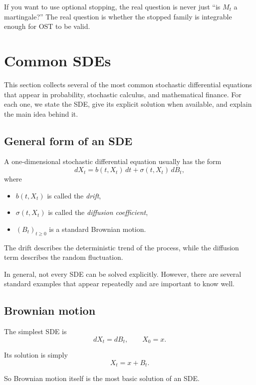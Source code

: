 \documentclass[11pt]{article}
\theoremstyle{definition}
\begin{document}
\begin{keyformula}
If you want to use optional stopping, the real question is never just ``is $M_t$ a martingale?'' The real question is whether the stopped family is integrable enough for OST to be valid.
\end{keyformula}

\section{Common SDEs}

This section collects several of the most common stochastic differential equations that appear in probability, stochastic calculus, and mathematical finance. For each one, we state the SDE, give its explicit solution when available, and explain the main idea behind it.

\subsection{General form of an SDE}

A one-dimensional stochastic differential equation usually has the form
\[
dX_t = b(t,X_t)\,dt + \sigma(t,X_t)\,dB_t,
\]
where
\begin{itemize}[leftmargin=2em]
    \item \(b(t,X_t)\) is called the \emph{drift},
    \item \(\sigma(t,X_t)\) is called the \emph{diffusion coefficient},
    \item \((B_t)_{t\ge 0}\) is a standard Brownian motion.
\end{itemize}

The drift describes the deterministic trend of the process, while the diffusion term describes the random fluctuation.

\medskip

\noindent
In general, not every SDE can be solved explicitly. However, there are several standard examples that appear repeatedly and are important to know well.

\subsection{Brownian motion}

The simplest SDE is
\[
dX_t = dB_t,
\qquad X_0=x.
\]

Its solution is simply
\[
X_t = x + B_t.
\]

So Brownian motion itself is the most basic solution of an SDE.
\end{document}
